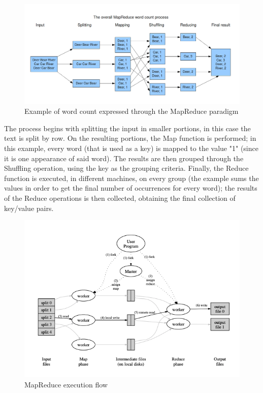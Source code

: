 \begin{figure}[H]
    \centering
    \includegraphics[width=\linewidth]{document/chapters/chapter_4/images/mapreduce_example.png}
    \caption{Example of word count expressed through the MapReduce paradigm \cite{mapreduce_example_site}}
    \label{fig:mapreduce_example}
\end{figure}

The process begins with splitting the input in smaller portions, in this case the text is split by row. On the resulting portions, the Map function is performed; in this example, every word (that is used as a key) is mapped to the value "1" (since it is one appearance of said word). The results are then grouped through the Shuffling operation, using the key as the grouping criteria. Finally, the Reduce function is executed, in different machines, on every group (the example sums the values in order to get the final number of occurrences for every word); the results of the Reduce operations is then collected, obtaining the final collection of key/value pairs.

\begin{figure}[H]
    \centering
    \includegraphics[width=\linewidth]{document/chapters/chapter_4/images/mapreduce_execution_flow.png}
    \caption{MapReduce execution flow \cite{google_mapreduce}}
    \label{fig:mapreduce_execution_flow}
\end{figure}

